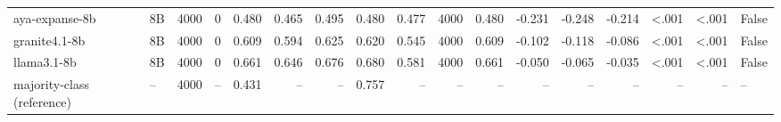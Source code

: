 \begin{table}[t]
\begin{tabular}{llrrrrrrrrrrrrrrl}
aya-expanse-8b & 8B & 4000 & 0 & 0.480 & 0.465 & 0.495 & 0.480 & 0.477 & 4000 & 0.480 & -0.231 & -0.248 & -0.214 & <.001 & <.001 & False \\
granite4.1-8b & 8B & 4000 & 0 & 0.609 & 0.594 & 0.625 & 0.620 & 0.545 & 4000 & 0.609 & -0.102 & -0.118 & -0.086 & <.001 & <.001 & False \\
llama3.1-8b & 8B & 4000 & 0 & 0.661 & 0.646 & 0.676 & 0.680 & 0.581 & 4000 & 0.661 & -0.050 & -0.065 & -0.035 & <.001 & <.001 & False \\
majority-class (reference) & -- & 4000 & -- & 0.431 & -- & -- & 0.757 & -- & -- & -- & -- & -- & -- & -- & -- & -- \\
\bottomrule
\end{tabular}
\end{table}
